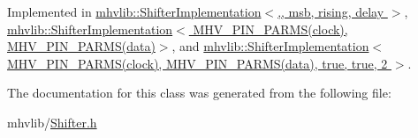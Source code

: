 Implemented in \hyperlink{classmhvlib_1_1_shifter_implementation_a5935d02b862d802c517e9e9093385681}{mhvlib\-::\-Shifter\-Implementation$<$,, msb, rising, delay $>$}, \hyperlink{classmhvlib_1_1_shifter_implementation_a5935d02b862d802c517e9e9093385681}{mhvlib\-::\-Shifter\-Implementation$<$ M\-H\-V\-\_\-\-P\-I\-N\-\_\-\-P\-A\-R\-M\-S(clock), M\-H\-V\-\_\-\-P\-I\-N\-\_\-\-P\-A\-R\-M\-S(data)$>$}, and \hyperlink{classmhvlib_1_1_shifter_implementation_a5935d02b862d802c517e9e9093385681}{mhvlib\-::\-Shifter\-Implementation$<$ M\-H\-V\-\_\-\-P\-I\-N\-\_\-\-P\-A\-R\-M\-S(clock), M\-H\-V\-\_\-\-P\-I\-N\-\_\-\-P\-A\-R\-M\-S(data), true, true, 2 $>$}.



The documentation for this class was generated from the following file\-:\begin{DoxyCompactItemize}
\item 
mhvlib/\hyperlink{_shifter_8h}{Shifter.\-h}\end{DoxyCompactItemize}
